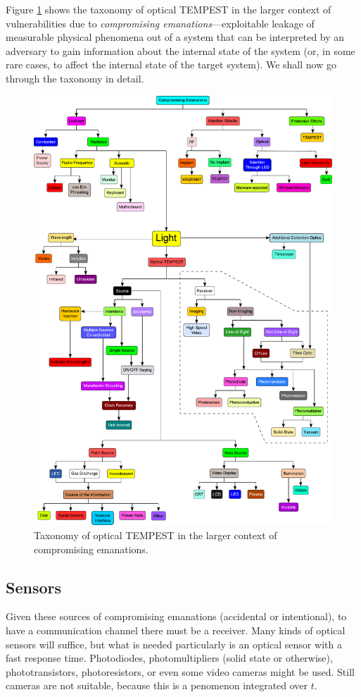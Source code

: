 \documentclass[a4paper,twoside,11pt]{book}
\begin{document}
Figure \ref{figure:taxonomy} shows the taxonomy of optical TEMPEST in the
larger context of vulnerabilities due to \emph{compromising
emanations}---exploitable leakage of measurable physical phenomena out of a
system that can be interpreted by an adversary to gain information about the
internal state of the system (or, in some rare cases, to affect the internal
state of the target system). We shall now go through the taxonomy in detail.
\begin{figure}[htp]
  \centering
  \includegraphics[width=\textwidth]{taxonomy.pdf}
  \caption{Taxonomy of optical TEMPEST in the larger context of compromising
    emanations.}
  \label{figure:taxonomy}
\end{figure}
\subsection{Sensors}
Given these sources of compromising emanations (accidental or intentional), to
have a communication channel there must be a receiver. Many kinds of optical
sensors will suffice, but what is needed particularly is an optical sensor with
a fast response time. Photodiodes, photomultipliers (solid state or otherwise),
phototransistors, photoresistors, or even some video cameras might be used.
Still cameras are not suitable, because this is a penomenon integrated over
$t$.
\end{document}
